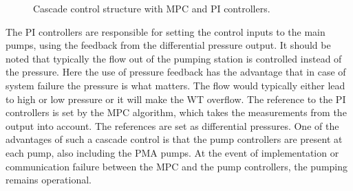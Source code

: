 
\begin{figure}[H]
\centering
 
\caption{Cascade control structure with MPC and PI controllers.}
\label{fig:control_structure}
\end{figure}

The PI controllers are responsible for setting the control inputs to the main pumps, using the feedback from the differential pressure output. It should be noted that typically the flow out of the pumping station is controlled instead of the pressure. Here the use of pressure feedback has the advantage that in case of system failure the pressure is what matters. The flow would typically either lead to high or low pressure or it will make the WT overflow. The reference to the PI controllers is set by the MPC algorithm, which takes the measurements from the output into account. The references are set as differential pressures. One of the advantages of such a cascade control is that the pump controllers are present at each pump, also including the PMA pumps. At the event of implementation or communication failure between the MPC and the pump controllers, the pumping remains operational. 
 




